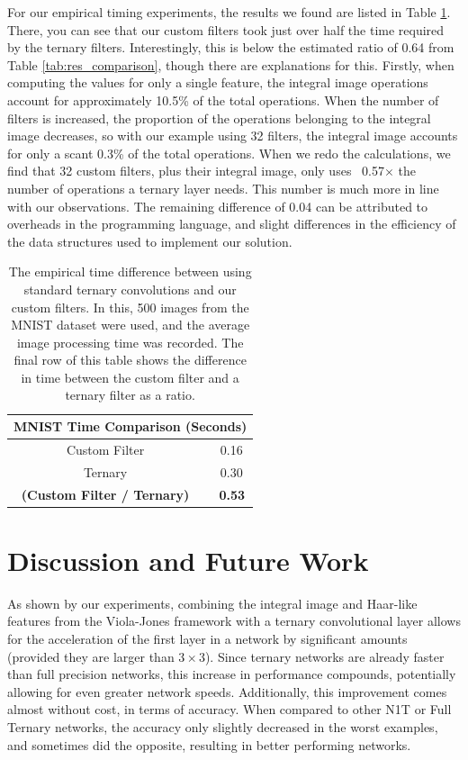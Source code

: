 \documentclass[11pt,a4paper,oldfontcommands]{memoir}
\begin{document}
For our empirical timing experiments, the results we found are listed in Table \ref{tab:res_time_comparison}. There, you can see that our custom filters took just over half the time required by the ternary filters. Interestingly, this is below the estimated ratio of 0.64 from Table \ref{tab:res_comparison}, though there are explanations for this. Firstly, when computing the values for only a single feature, the integral image operations account for approximately 10.5\% of the total operations. When the number of filters is increased, the proportion of the operations belonging to the integral image decreases, so with our example using 32 filters, the integral image accounts for only a scant 0.3\% of the total operations. When we redo the calculations, we find that 32 custom filters, plus their integral image, only uses ~0.57$\times$ the number of operations a ternary layer needs. This number is much more in line with our observations. The remaining difference of 0.04 can be attributed to overheads in the programming language, and slight differences in the efficiency of the data structures used to implement our solution. 

\begin{table}[h]
\centering
    \begin{tabular}{|c | c|} 
        \hline
        \multicolumn{2}{|c|}{MNIST Time Comparison (Seconds)} \\
        \hline
        Custom Filter & ~0.16 \\
        Ternary & ~0.30 \\
        \hline
        \textbf{(Custom Filter / Ternary)} & \textbf{~0.53} \\
        \hline
    \end{tabular}
\caption{The empirical time difference between using standard ternary convolutions and our custom filters. In this, 500 images from the MNIST dataset were used, and the average image processing time was recorded. The final row of this table shows the difference in time between the custom filter and a ternary filter as a ratio.}
\label{tab:res_time_comparison}
\end{table}

\section{Discussion and Future Work}
As shown by our experiments, combining the integral image and Haar-like features from the Viola-Jones framework with a ternary convolutional layer allows for the acceleration of the first layer in a network by significant amounts (provided they are larger than $3\times3$). Since ternary networks are already faster than full precision networks, this increase in performance compounds, potentially allowing for even greater network speeds. Additionally, this improvement comes almost without cost, in terms of accuracy. When compared to other N1T or Full Ternary networks, the accuracy only slightly decreased in the worst examples, and sometimes did the opposite, resulting in better performing networks. 
\end{document}
